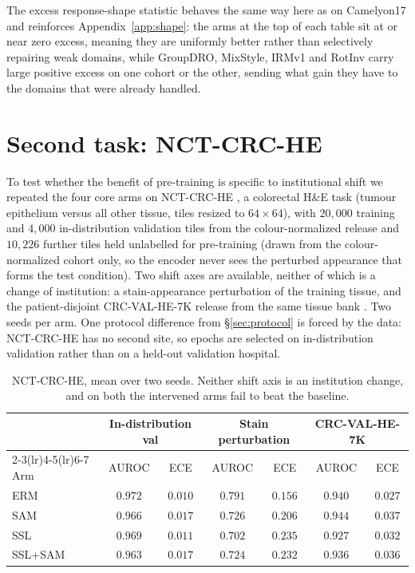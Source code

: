 \documentclass[10pt]{article} %
\begin{document}
The excess response-shape statistic behaves the same way here as on
Camelyon17 and reinforces Appendix~\ref{app:shape}: the arms at the top of each table
sit at or near zero excess, meaning they are uniformly better rather than
selectively repairing weak domains, while GroupDRO, MixStyle, IRMv1 and RotInv
carry large positive excess on one cohort or the other, sending what gain they
have to the domains that were already handled.

\section{Second task: NCT-CRC-HE}
\label{app:crc}

To test whether the benefit of pre-training is specific to institutional shift
we repeated the four core arms on NCT-CRC-HE \citep{kather2018nct}, a
colorectal H\&E task (tumour epithelium versus all other tissue, tiles resized
to $64\times64$), with $20{,}000$ training and $4{,}000$ in-distribution
validation tiles from the colour-normalized release and $10{,}226$ further
tiles held unlabelled for pre-training (drawn from the colour-normalized
cohort only, so the encoder never sees the perturbed appearance that forms the
test condition). Two shift axes are available, neither of which is a change of
institution: a stain-appearance perturbation of the training tissue, and the
patient-disjoint CRC-VAL-HE-7K release from the same tissue bank
\citep{kather2019predicting}. Two seeds per arm. One protocol difference from
\S\ref{sec:protocol} is forced by the data: NCT-CRC-HE has no second site, so
epochs are selected on in-distribution validation rather than on a held-out
validation hospital.

\begin{table}[h]
\centering
\caption{NCT-CRC-HE, mean over two seeds. Neither shift axis is an institution
change, and on both the intervened arms fail to beat the baseline.}
\label{tab:crc}
\small
\begin{tabular}{lcccccc}
\toprule
& \multicolumn{2}{c}{In-distribution val} & \multicolumn{2}{c}{Stain perturbation} & \multicolumn{2}{c}{CRC-VAL-HE-7K} \\
\cmidrule(lr){2-3}\cmidrule(lr){4-5}\cmidrule(lr){6-7}
Arm & AUROC & ECE & AUROC & ECE & AUROC & ECE \\
\midrule
ERM     & $0.972$ & $0.010$ & $\mathbf{0.791}$ & $\mathbf{0.156}$ & $0.940$ & $\mathbf{0.027}$ \\
SAM     & $0.966$ & $0.017$ & $0.726$ & $0.206$ & $\mathbf{0.944}$ & $0.037$ \\
SSL     & $0.969$ & $0.011$ & $0.702$ & $0.235$ & $0.927$ & $0.032$ \\
SSL+SAM & $0.963$ & $0.017$ & $0.724$ & $0.232$ & $0.936$ & $0.036$ \\
\bottomrule
\end{tabular}
\end{table}
\end{document}
